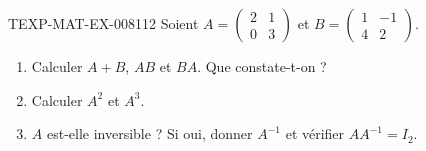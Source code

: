 \begin{exercice}{TEXP-MAT-EX-008}{1}{12}
Soient $A=\begin{pmatrix}2&1\\0&3\end{pmatrix}$ et
$B=\begin{pmatrix}1&-1\\4&2\end{pmatrix}$.
\begin{enumerate}
  \item Calculer $A+B$, $AB$ et $BA$. Que constate-t-on ?
  \item Calculer $A^2$ et $A^3$.
  \item $A$ est-elle inversible ? Si oui, donner $A^{-1}$ et vérifier
        $AA^{-1}=I_2$.
\end{enumerate}
\end{exercice}
